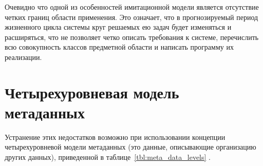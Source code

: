 Очевидно что одной из особенностей имитационной модели является отсутствие четких границ области применения.
Это означает, что в прогнозируемый период жизненного цикла системы круг решаемых ею задач будет изменяться и расширяться,
что не позволяет четко описать требования к системе, перечислить всю совокупность классов предметной области и
написать программу их реализации.

\section{Четырехуровневая модель метаданных}
Устранение этих недостатков возможно при использовании концепции четырехуровневой модели метаданных (это данные, описывающие организацию других данных),
приведенной в таблице~\ref{tbl:meta_data_levels} \cite{journal:vestnik_spbgu:ivakin,book:gost:56272,w3c:rdf:lassila}.

